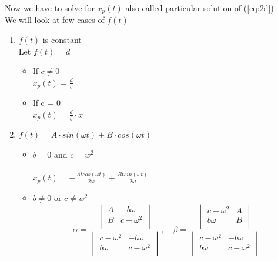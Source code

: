 \documentclass{article}
\begin{document}
\noindent Now we have to solve for $x_p(t)$ also called particular solution of (\ref{eq:2d})\\
We will look at few cases of $f(t)$\\
\begin{enumerate}
    \item $f(t)$ is constant\\
    Let $f(t) = d$\\
    \begin{itemize}
        \item If $c \neq 0$\\
        $x_p(t) = \frac{d}{c}$\\
        \item If c = 0\\
        $x_p(t) = \frac{d}{b}\cdot x$
    \end{itemize}

    \item $f(t) = A\cdot sin(\omega t) + B\cdot cos(\omega t)$\\
    \begin{itemize}
        \item $b = 0$ and $c = w^2$\\\\
        $x_p(t) = -\frac{A t cos(\omega t)}{2\omega} + \frac{B t sin(\omega t)}{2\omega}$\\
        \item $b \neq 0$ or $c \neq w^2$\\
        $$\alpha = \frac{
            \begin{vmatrix}
        A & -b\omega \\
        B & c-\omega^{2} \\
        \end{vmatrix}}{
            \begin{vmatrix}
            c-\omega^2 & -b\omega \\
            b\omega & c-\omega^2 \\
             \end{vmatrix}
        }, \quad
        \beta = \frac{
            \begin{vmatrix}
            c-\omega^2 & A \\
            b\omega & B \\
            \end{vmatrix}
        }{\begin{vmatrix}
            c-\omega^2 & -b\omega \\
            b\omega & c-\omega^2 \\
             \end{vmatrix}
        }$$\\


\end{itemize}
\end{enumerate}
\end{document}
